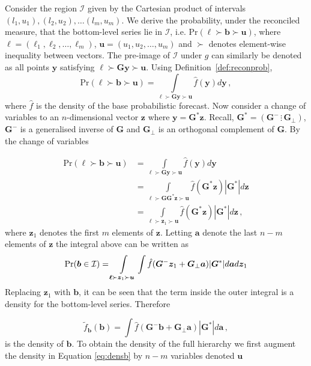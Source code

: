\documentclass[11pt]{article}
\theoremstyle{definition}
\begin{document}
Consider the region $\mathcal{I}$ given by the Cartesian product of intervals $(l_1,u_1),(l_2,u_2),\ldots(l_m,u_m)$. We derive the probability, under the reconciled measure, that the bottom-level series lie in $\mathcal{I}$, i.e. $\mbox{Pr}(\bm{\ell}\succ\bm{b}\succ\bm{u})$, where $\bm{\ell}=(\ell_1,\ell_2,\ldots,\ell_m)$, $\bm{u}=(u_1,u_2,\ldots,u_m)$ and $\succ$ denotes element-wise inequality between vectors. The pre-image of $\mathcal{I}$ under $g$ can similarly be denoted as all points $\bm{y}$ satisfying $\bm{\ell}\succ\bm{G}\bm{y}\succ\bm{u}$. Using Definition~\ref{def:reconprob},
\[
\mbox{Pr}(\bm{\ell}\succ\bm{b}\succ\bm{u})=\int\limits_{\bm{\ell}\succ\bm{G}\bm{y}\succ\bm{u}}\hat{f}(\bm{y})d\bm{y}\,,
\]
where $\hat{f}$ is the density of the base probabilistic forecast. Now consider a change of variables to an $n$-dimensional vector $\bm{z}$ where $\bm{y}=\bm{G}^*\bm{z}$. Recall, $\bm{G}^*=\left(\bm{G}^{-}\,\vdots\,\bm{G}_\perp\right)$, $\bm{G}^{-}$ is a generalised inverse of $\bm{G}$ and $\bm{G}_\perp$ is an orthogonal complement of $\bm{G}$. By the change of variables

\begin{align}
\mbox{Pr}(\bm{\ell}\succ\bm{b}\succ\bm{u})&=\int\limits_{\bm{\ell}\succ\bm{G}\bm{y}\succ\bm{u}}\hat{f}(\bm{y})d\bm{y}\nonumber\\
&=\int\limits_{\bm{\ell}\succ\bm{G}\bm{G}^*\bm{z}\succ\bm{u}}\hat{f}(\bm{G}^*\bm{z})|\bm{G}^*|d\bm{z}\nonumber\\
&=\int\limits_{\bm{\ell}\succ\bm{z}_1\succ\bm{u}}\hat{f}(\bm{G}^*\bm{z})|\bm{G}^*|d\bm{z}\nonumber\,,
\end{align}
where $\bm{z}_1$ denotes the first $m$ elements of $\bm{z}$. Letting $\bm{a}$ denote the last $n-m$ elements of $\bm{z}$ the integral above can be written as
\[
\mbox{Pr}(\bm{b}\in \mathcal{I})=\int\limits_{\bm{\ell}\succ\bm{z}_1\succ\bm{u}}\int\hat{f}(\bm{G}^{-}\bm{z}_1+\bm{G}_{\perp}\bm{a})|\bm{G}^*|d\bm{a}d\bm{z}_1\nonumber\\
\]
Replacing $\bm{z}_1$ with $\bm{b}$, it can be seen that the term inside the outer integral is a density for the bottom-level series. Therefore

\begin{equation}
\tilde{f}_{\bm{b}}(\bm{b})=\int\hat{f}(\bm{G}^{-}\bm{b}+\bm{G}_{\perp}\bm{a})|\bm{G}^*|d\bm{a}\,,
\label{eq:densb}
\end{equation}
is the density of $\bm{b}$. To obtain the density of the full hierarchy we first augment the density in Equation \eqref{eq:densb} by $n-m$ variables denoted $\bm{u}$
\end{document}
